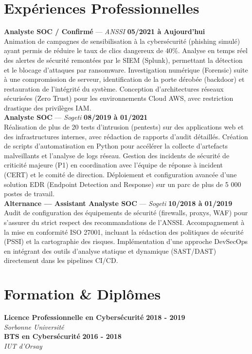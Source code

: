 \documentclass[11pt,a4paper]{article}
\begin{document}
\section*{Expériences Professionnelles}
\noindent \textbf{Analyste SOC / Confirmé} --- \textit{ANSSI} \hfill \textbf{05/2021 à Aujourd'hui} \\
Animation de campagnes de sensibilisation à la cybersécurité (phishing simulé) ayant permis de réduire le taux de clics dangereux de 40\%. Analyse en temps réel des alertes de sécurité remontées par le SIEM (Splunk), permettant la détection et le blocage d'attaques par ransomware. Investigation numérique (Forensic) suite à une compromission de serveur, identification de la porte dérobée (backdoor) et restauration de l'intégrité du système. Conception d'architectures réseaux sécurisées (Zero Trust) pour les environnements Cloud AWS, avec restriction drastique des privilèges IAM. \\[0.3cm]
\noindent \textbf{Analyste SOC} --- \textit{Sogeti} \hfill \textbf{08/2019 à 01/2021} \\
Réalisation de plus de 20 tests d'intrusion (pentests) sur des applications web et des infrastructures internes, avec rédaction de rapports d'audit détaillés. Création de scripts d'automatisation en Python pour accélérer la collecte d'artefacts malveillants et l'analyse de logs réseau. Gestion des incidents de sécurité de criticité majeure (P1) en coordination avec l'équipe de réponse à incident (CERT) et le comité de direction. Déploiement et configuration avancée d'une solution EDR (Endpoint Detection and Response) sur un parc de plus de 5 000 postes de travail. \\[0.3cm]
\noindent \textbf{Alternance — Assistant Analyste SOC} --- \textit{Sogeti} \hfill \textbf{10/2018 à 01/2019} \\
Audit de configuration des équipements de sécurité (firewalls, proxys, WAF) pour s'assurer du strict respect des recommandations de l'ANSSI. Accompagnement à la mise en conformité ISO 27001, incluant la rédaction des politiques de sécurité (PSSI) et la cartographie des risques. Implémentation d'une approche DevSecOps en intégrant des outils d'analyse statique et dynamique (SAST/DAST) directement dans les pipelines CI/CD. \\[0.3cm]


\vspace{0.3cm}

\section*{Formation \& Diplômes}
\noindent \textbf{Licence Professionnelle en Cybersécurité} \hfill \textbf{2018 - 2019} \\
\textit{Sorbonne Université} \\[0.3cm]
\noindent \textbf{BTS en Cybersécurité} \hfill \textbf{2016 - 2018} \\
\textit{IUT d'Orsay} \\[0.3cm]
\end{document}
